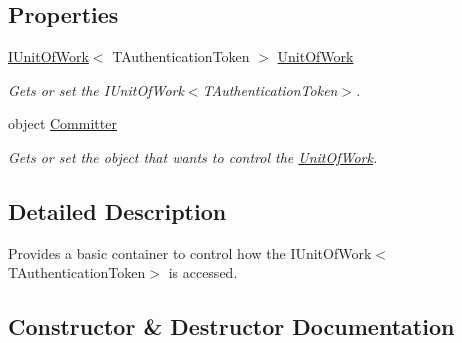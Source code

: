 \subsection*{Properties}
\begin{DoxyCompactItemize}
\item 
\hyperlink{interfaceCqrs_1_1Domain_1_1IUnitOfWork}{I\+Unit\+Of\+Work}$<$ T\+Authentication\+Token $>$ \hyperlink{classCqrs_1_1Services_1_1UnitOfWorkService_a1ba76512e37e5006c2b65d071803e99f_a1ba76512e37e5006c2b65d071803e99f}{Unit\+Of\+Work}
\begin{DoxyCompactList}\small\item\em Gets or set the I\+Unit\+Of\+Work$<$\+T\+Authentication\+Token$>$. \end{DoxyCompactList}\item 
object \hyperlink{classCqrs_1_1Services_1_1UnitOfWorkService_aabeccb6ba949fe02b8676b324f85950b_aabeccb6ba949fe02b8676b324f85950b}{Committer}
\begin{DoxyCompactList}\small\item\em Gets or set the object that wants to control the \hyperlink{classCqrs_1_1Services_1_1UnitOfWorkService_a1ba76512e37e5006c2b65d071803e99f_a1ba76512e37e5006c2b65d071803e99f}{Unit\+Of\+Work}. \end{DoxyCompactList}\end{DoxyCompactItemize}


\subsection{Detailed Description}
Provides a basic container to control how the I\+Unit\+Of\+Work$<$\+T\+Authentication\+Token$>$ is accessed. 



\subsection{Constructor \& Destructor Documentation}
\mbox{\label{classCqrs_1_1Services_1_1UnitOfWorkService_a187b3f612490a8316770bb7c6a9aa25f_a187b3f612490a8316770bb7c6a9aa25f}} 
